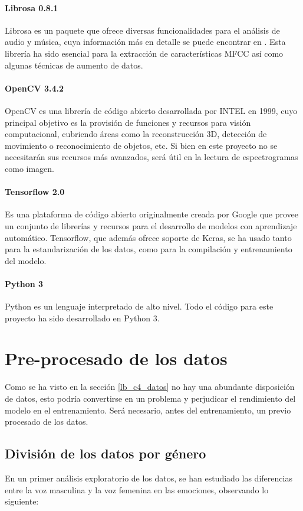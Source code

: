 \documentclass[11pt,a4paper,spanish]{book}
\begin{document}
	\paragraph{Librosa 0.8.1} Librosa es un paquete que ofrece diversas funcionalidades para el análisis de audio y música, cuya información más en detalle se puede encontrar en \cite{librosa082}. Esta librería ha sido esencial para la extracción de características MFCC así como algunas técnicas de aumento de datos.
	
	\paragraph{OpenCV 3.4.2} OpenCV es una librería de código abierto desarrollada por INTEL en 1999, cuyo principal objetivo es la provisión de funciones y recursos para visión computacional, cubriendo áreas como la reconstrucción 3D, detección de movimiento o reconocimiento de objetos, etc. Si bien en este proyecto no se necesitarán sus recursos más avanzados, será útil en la lectura de espectrogramas como imagen. 
	
	\paragraph{Tensorflow 2.0} Es una plataforma de código abierto originalmente creada por Google que provee un conjunto de librerías y recursos para el desarrollo de modelos con aprendizaje automático. Tensorflow, que además ofrece soporte de Keras, se ha usado tanto para la estandarización de los datos, como para la compilación y entrenamiento del modelo.
	
	\paragraph{Python 3} Python es un lenguaje interpretado de alto nivel. Todo el código para este proyecto ha sido desarrollado en Python 3.
	
	\section{Pre-procesado de los datos}
	Como se ha visto en la sección \ref{lb_c4_datos} no hay una abundante disposición de datos, esto podría convertirse en un problema y perjudicar el rendimiento del modelo en el entrenamiento. 
	Será necesario, antes del entrenamiento, un previo procesado de los datos.
	
	\subsection{División de los datos por género}
	\label{cap4:division}
	En un primer análisis exploratorio de los datos, se han estudiado las diferencias entre la voz masculina y la voz femenina en las emociones, observando lo siguiente:
	
\end{document}
